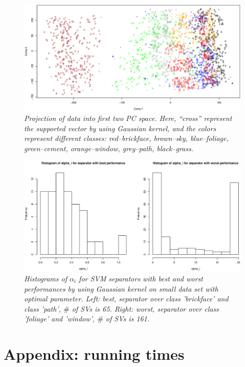 \documentclass{article}
\begin{document}
\begin{figure}[htp]
\centering
\includegraphics[width=12.1cm]{small_svm_gaussian.eps}
\caption{\textit{Projection of data into first two PC space. Here, ``cross'' represent the supported vector by using Gaussian kernel, and the colors represent different classes: red--brickface, brown--sky, blue--foliage, green--cement, orange--window, grey--path, black--grass.}}
\end{figure}

\begin{figure}[htp]
\centering
\includegraphics[width=12.1cm]{small_hist_gaussian.eps}
\caption{\textit{Histograms of $\alpha_{i}$ for SVM separators with best and worst performances by using Gaussian kernel on small data set with optimal parameter. Left: best, separator over class 'brickface' and class 'path', $\#$ of SVs is 65. Right: worst, separator over class 'foliage' and 'window', $\#$ of SVs is 161.}}
\end{figure}

\goodbreak

\newpage

\appendix

\section{Appendix: running times}
\end{document}
